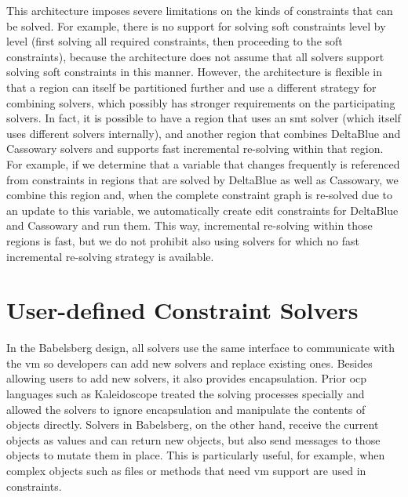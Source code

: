 This architecture imposes severe limitations on the kinds of
constraints that can be solved. For example, there is no support for
solving soft constraints level by level (first solving all required
constraints, then proceeding to the soft constraints), because the
architecture does not assume that all solvers support solving soft
constraints in this manner. However, the architecture is flexible in
that a region can itself be partitioned further and use a different
strategy for combining solvers, which possibly has stronger
requirements on the participating solvers. In fact, it is possible to
have a region that uses an \gls{smt} solver (which itself uses
different solvers internally), and another region that combines
DeltaBlue and Cassowary solvers and supports fast incremental
re-solving within that region. For example, if we determine that a
variable that changes frequently is referenced from constraints in
regions that are solved by DeltaBlue as well as Cassowary, we combine
this region and, when the complete constraint graph is re-solved due
to an update to this variable, we automatically create edit
constraints for DeltaBlue and Cassowary and run them. This way,
incremental re-solving within those regions is fast, but we do not
prohibit also using solvers for which no fast incremental re-solving
strategy is available.

\section{User-defined Constraint Solvers}
\label{sec:user-defined-constraint-solvers}

In the Babelsberg design, all solvers use the same interface to
communicate with the \ac{vm} so developers can add new solvers and
replace existing ones. Besides allowing users to add new solvers, it
also provides encapsulation. Prior \ac{ocp} languages such as
Kaleidoscope treated the solving processes specially and allowed the
solvers to ignore encapsulation and manipulate the contents of objects
directly. Solvers in Babelsberg, on the other hand, receive the
current objects as values and can return new objects, but also send
messages to those objects to mutate them in place. This is
particularly useful, for example, when complex objects such as files
or methods that need \ac{vm} support are used in constraints.


